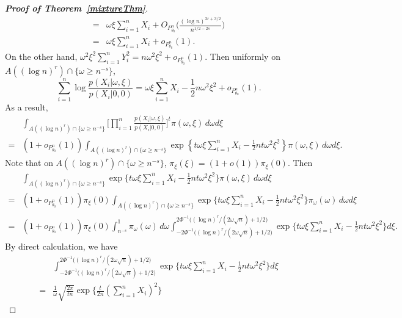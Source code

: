 \documentclass[11pt]{article}
\theoremstyle{plain}
\theoremstyle{definition}
\theoremstyle{remark}
\begin{document}
\begin{appendices}
\begin{proof}[\textbf{Proof of Theorem~\ref{mixtureThm}}]
\begin{align*}
    =&
    \omega \xi\sum_{i=1}^n X_i + O_{P^n_{\theta_0}}\Big( \frac{(\log n)^{3r+3/2}}{n^{1/2-2s}}\Big)
    \\
=&
\omega \xi\sum_{i=1}^n X_i + o_{P^n_{\theta_0}}(1).
\end{align*}
On the other hand, $\omega^2 \xi^2 \sum_{i=1}^n Y_i^2=n\omega^2 \xi^2 +o_{P^n_{\theta_0}}(1)$.
Then uniformly on $A((\log n)^r)\cap \{\omega\geq n^{-s}\}$,
\begin{equation}\label{eq:mixtureaiya1}
    \sum_{i=1}^n \log \frac{p(X_i|\omega,\xi)}{ p(X_i|0,0)}
    =\omega \xi \sum_{i=1}^n X_i -\frac{1}{2} n\omega^2 \xi^2+o_{P^n_{\theta_0}}(1).
\end{equation}
As a result,
\begin{align*}
    & \int_{A((\log n)^r)\cap \{\omega\geq n^{-s}\}} \Big[\prod_{i=1}^n \frac{p(X_i|\omega,\xi)}{p(X_i|0,0)}\Big]^t \pi(\omega,\xi)\, d\omega d\xi
    \\
    =&(1+o_{P^n_{\theta_0}}(1))\int_{A( (\log n)^r )\cap \{\omega\geq  n^{-s}\} } \exp\left\{
        t\omega \xi \sum_{i=1}^n X_i -\frac{1}{2} nt\omega^2 \xi^2
    \right\} \pi(\omega,\xi)\, d\omega d\xi.
\end{align*}
Note that on $A((\log n)^r)\cap \{\omega\geq n^{-s}\}$, $\pi_{\xi}(\xi)=(1+o(1))\pi_\xi(0)$. Then
\begin{align*}
    &\int_{A((\log n)^r)\cap \{\omega\geq n^{-s}\} } \exp\big\{
        t\omega \xi \sum_{i=1}^n X_i -\frac{1}{2} nt\omega^2 \xi^2
    \big\} \pi(\omega,\xi)\, d\omega d\xi
    \\
    =&(1+o_{P^n_{\theta_0}}(1))\pi_{\xi}(0)
    \int_{A((\log n)^r)\cap \{\omega\geq  n^{-s}\} } \exp\big\{
        t\omega \xi \sum_{i=1}^n X_i -\frac{1}{2} nt\omega^2 \xi^2
    \big\} \pi_{\omega}(\omega)\, d\omega d\xi
    \\
    =&(1+o_{P^n_{\theta_0}}(1))\pi_{\xi}(0)\int_{n^{-s}}^1 \pi_{\omega}(\omega)\, d\omega 
    \int_{-2\Phi^{-1}\big((\log n)^r/(2\omega \sqrt{n})+1/2\big)}^{2\Phi^{-1}\big((\log n)^r/(2\omega \sqrt{n})+1/2\big)} \exp\big\{
        t\omega \xi \sum_{i=1}^n X_i -\frac{1}{2} nt\omega^2 \xi^2
    \big\} d\xi.
\end{align*}
By direct calculation, we have
\begin{align*}
    &\int_{-2\Phi^{-1}\big((\log n)^r/(2\omega \sqrt{n})+1/2\big)}^{2\Phi^{-1}\big((\log n)^r/(2\omega \sqrt{n})+1/2\big)} \exp\big\{
        t\omega \xi \sum_{i=1}^n X_i -\frac{1}{2} nt\omega^2 \xi^2
\big\} d\xi
\\
=&
 \frac{1}{\omega} \sqrt{\frac{2\pi}{tn}}  \exp\Big\{\frac{t}{2n}(\sum_{i=1}^n X_i)^2\Big\}

\end{align*}
\end{proof}
\end{appendices}
\end{document}

